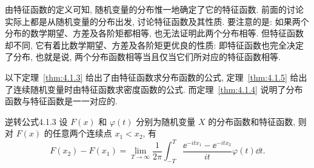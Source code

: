 由特征函数的定义可知, 随机变量的分布惟一地确定了它的特征函数.
前面的讨论实际上都是从随机变量的分布出发, 讨论特征函数及其性质.
要注意的是: 如果两个分布的数学期望、方差及各阶矩都相等, 也无法证明此两个分布相等.
但特征函数却不同, 它有着比数学期望、方差及各阶矩更优良的性质: 即特征函数也完全决定了分布, 也就是说, 两个分布函数相等当且仅当它们所对应的特征函数相等.

以下定理~\ref{thm:4.1.3} 给出了由特征函数求分布函数的公式, 定理~\ref{thm:4.1.5} 给出了连续随机变量时由特征函数求密度函数的公式.
而定理~\ref{thm:4.1.4} 说明了分布函数与特征函数是一一对应的.

\begin{theorem}{逆转公式}{4.1.3}
    设 $ F (x) $ 和 $ \varphi (t) $ 分别为随机变量 $ X $ 的分布函数和特征函数, 则对 $ F (x) $ 的任意两个连续点 $ x_1 < x_2 $, 有
    \begin{equation}\label{eq:4.1.11}
        F (x_2) - F (x_1) = \lim_{T \to \infty} \frac{1}{2\pi} \int_{-T}^T \frac{\ee^{-itx_1}  - \ee^{-itx_2}}{it} \varphi (t) \dd t.
    \end{equation}
\end{theorem}

